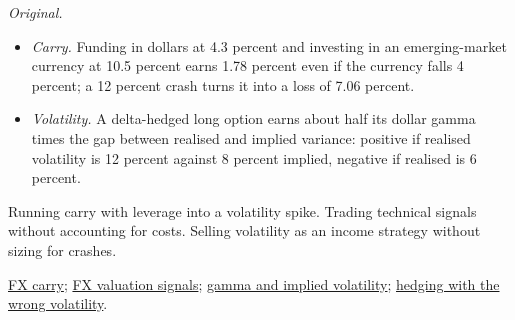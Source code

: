 \begin{qfmethod}
 \emph{Original.}
\begin{itemize}
\item \emph{Carry.} Funding in dollars at 4.3 percent and investing in an emerging-market currency at 10.5 percent earns 1.78 percent even if the currency falls 4 percent; a 12 percent crash turns it into a loss of 7.06 percent.
\item \emph{Volatility.} A delta-hedged long option earns about half its dollar gamma times the gap between realised and implied variance: positive if realised volatility is 12 percent against 8 percent implied, negative if realised is 6 percent.
\end{itemize}

 Running carry with leverage into a volatility spike. Trading technical signals without accounting for costs. Selling volatility as an income strategy without sizing for crashes.

 \hyperref[mod:fx-carry-trade]{FX carry}; \hyperref[meth:fx-valuation-signals]{FX valuation signals}; \hyperref[meth:greeks-delta-gamma-hedging]{gamma and implied volatility}; \hyperref[res:delta-hedging-volatility-mismatch]{hedging with the wrong volatility}.

\end{qfmethod}

